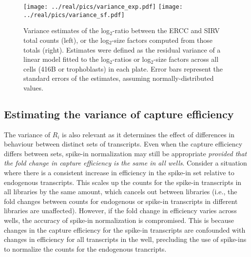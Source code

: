\documentclass{article}
\begin{document}
\begin{figure}[btp]
    \begin{center}
        \texttt{[image: ../real/pics/variance\_exp.pdf]}
        \texttt{[image: ../real/pics/variance\_sf.pdf]}
    \end{center}
    \caption{Variance estimates of the log$_2$-ratio between the ERCC and SIRV total counts (left), or the log$_2$-size factors computed from those totals (right).
        Estimates were defined as the residual variance of a linear model fitted to the log$_2$-ratios or log$_2$-size factors across all cells (416B or trophoblasts) in each plate.
        Error bars represent the standard errors of the estimates, assuming normally-distributed values.
    }
    \label{fig:varestimates}
\end{figure}

\subsection{Estimating the variance of capture efficiency}
The variance of $R_i$ is also relevant as it determines the effect of differences in behaviour between distinct sets of transcripts.
Even when the capture efficiency differs between sets, spike-in normalization may still be appropriate \textit{provided that the fold change in capture efficiency is the same in all wells}.
Consider a situation where there is a consistent increase in efficiency in the spike-in set relative to endogenous transcripts.
This scales up the counts for the spike-in transcripts in all libraries by the same amount, which cancels out between libraries (i.e., the fold changes between counts for endogenous or spike-in transcripts in different libraries are unaffected).
However, if the fold change in efficiency varies across wells, the accuracy of spike-in normalization is compromised.
This is because changes in the capture efficiency for the spike-in transcripts are confounded with changes in efficiency for all transcripts in the well, precluding the use of spike-ins to normalize the counts for the endogenous trancripts.
\end{document}
